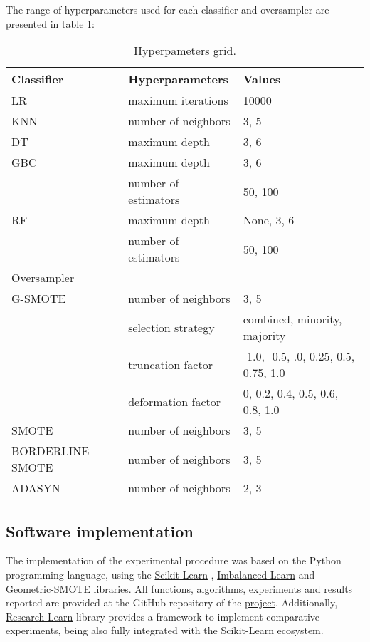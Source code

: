 \documentclass[remotesensing,article,submit,moreauthors,pdftex]{Definitions/mdpi}
\begin{document}
The range of hyperparameters used for each classifier and oversampler are
presented in table \ref{tab:grid}:

\begin{table}[H]
	\centering
	\begin{tabular}{lll}
		\toprule
		Classifier       & Hyperparameters & Values\\
		\hline
		LR               & maximum iterations   & 10000   \\
		KNN              & number of neighbors  & {3, 5} \\
		DT               & maximum depth        & {3, 6} \\
		GBC              & maximum depth        & {3, 6} \\
    			 		 & number of estimators & {50, 100} \\
		RF               & maximum depth        & {None, 3, 6} \\
				 		 & number of estimators & {50, 100} \\
		\toprule
		Oversampler      &                      & \\
		\hline
		G-SMOTE          & number of neighbors  & {3, 5} \\
				 		 & selection strategy   & combined, minority, majority\\
				 		 & truncation factor    & {-1.0, -0.5, .0, 0.25, 0.5,
				 		 0.75, 1.0} \\
				 		 & deformation factor   & {0, 0.2, 0.4, 0.5, 0.6, 0.8,
				 		 1.0} \\
 		SMOTE            & number of neighbors & {3, 5} \\
		BORDERLINE SMOTE & number of neighbors & {3, 5} \\
		ADASYN           & number of neighbors & {2, 3} \\
		\bottomrule
	\end{tabular}
	\caption{\label{tab:grid}Hyperpameters grid.}
\end{table}

\subsection{Software implementation}

The implementation of the experimental procedure was based on the Python
programming language, using the
\href{https://scikit-learn.org/stable/}{Scikit-Learn} \cite{Pedregosa2011},
\href{https://imbalanced-learn.org/en/stable/}{Imbalanced-Learn} \cite{JMLR:v18:16-365} 
and
\href{https://geometric-smote.readthedocs.io/en/latest/?badge=latest}{Geometric-SMOTE}
libraries. All functions, algorithms, experiments and results reported are
provided at the GitHub repository of the
\href{https://github.com/AlgoWit/publications/tree/master/remote-sensing-lucas}{project}.
Additionally,
\href{https://research-learn.readthedocs.io/en/latest/?badge=latest}{Research-Learn}
library provides a framework to implement comparative experiments, being also
fully integrated with the Scikit-Learn ecosystem.
\end{document}
